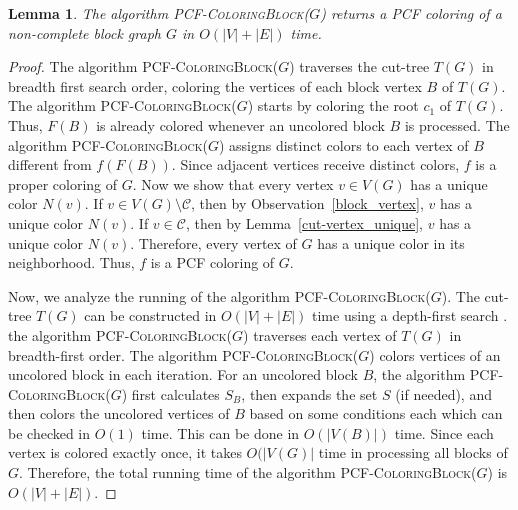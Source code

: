\documentclass[11pt]{article}
\theoremstyle{plain}
\newtheorem{lemma}{Lemma}
\begin{document}
	\begin{lemma}\label{block_correct_time}
		The algorithm \textsc{PCF-ColoringBlock($G$)} returns a PCF coloring of a non-complete block graph $G$ in $O(|V|+|E|)$ time.
	\end{lemma}
	\begin{proof}
		
		The algorithm \textsc{PCF-ColoringBlock($G$)} traverses the cut-tree $T(G)$ in breadth first search order, coloring the vertices of each block vertex $B$ of $T(G)$. 
		The algorithm \textsc{PCF-ColoringBlock($G$)} starts by coloring the root $c_1$ of $T(G)$. 
		Thus, $F(B)$ is already colored whenever an uncolored block $B$ is processed. 
		The algorithm \textsc{PCF-ColoringBlock($G$)} assigns distinct colors to each vertex of $B$ different from $f(F(B))$.  
		Since adjacent vertices receive distinct colors, $f$ is a proper coloring of $G$. Now we show that every vertex $v\in V(G)$ has a unique color $N(v)$. If $v\in V(G)\setminus \mathcal{C}$, then by Observation~\ref{block_vertex}, $v$ has a unique color $N(v)$. If $v\in \mathcal{C}$, then by Lemma~\ref{cut-vertex_unique}, $v$ has a unique color $N(v)$. Therefore, every vertex of $G$ has a unique color in its neighborhood. Thus, $f$ is a PCF coloring of $G$.
		
		\medskip
		
		Now, we analyze the running of the algorithm \textsc{PCF-ColoringBlock($G$)}.
		The cut-tree $T(G)$ can be constructed in $O(|V|+|E|)$ time using a depth-first search \cite{AHU_textbook}. the algorithm \textsc{PCF-ColoringBlock($G$)} traverses each vertex of $T(G)$ in breadth-first order. The algorithm \textsc{PCF-ColoringBlock($G$)} colors vertices of an uncolored block in each iteration. For an uncolored block $B$, the algorithm \textsc{PCF-ColoringBlock($G$)} first calculates $S_B$, then expands the set $S$ (if needed), and then colors the uncolored vertices of $B$ based on some conditions each which can be checked in $O(1)$ time. This can be done in $O(|V(B)|)$ time. Since each vertex is colored exactly once, it takes $O(|V(G)|$ time in processing all blocks of $G$. Therefore, the total running time of the algorithm \textsc{PCF-ColoringBlock($G$)}
		is $O(|V|+|E|)$.
	\end{proof}
	
\end{document}
